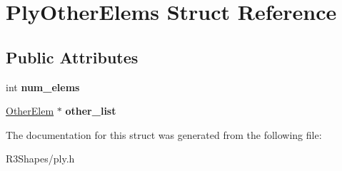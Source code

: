 \hypertarget{struct_ply_other_elems}{}\section{Ply\+Other\+Elems Struct Reference}
\label{struct_ply_other_elems}
\subsection*{Public Attributes}
\begin{DoxyCompactItemize}
\item 
int {\bfseries num\+\_\+elems}\hypertarget{struct_ply_other_elems_ab464cc630ef0f33b64474ddf9dd00d63}{}\label{struct_ply_other_elems_ab464cc630ef0f33b64474ddf9dd00d63}

\item 
\hyperlink{struct_other_elem}{Other\+Elem} $\ast$ {\bfseries other\+\_\+list}\hypertarget{struct_ply_other_elems_a2a3390c0b6de21756b10ae550c66de8a}{}\label{struct_ply_other_elems_a2a3390c0b6de21756b10ae550c66de8a}

\end{DoxyCompactItemize}


The documentation for this struct was generated from the following file\+:\begin{DoxyCompactItemize}
\item 
R3\+Shapes/ply.\+h\end{DoxyCompactItemize}
